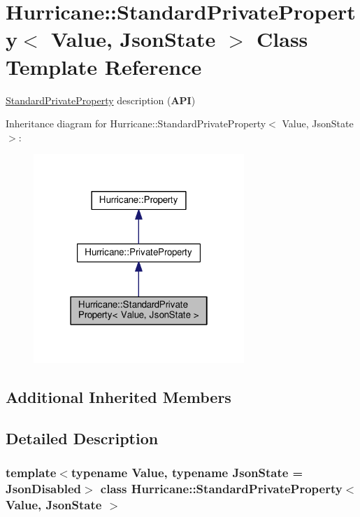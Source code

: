 \hypertarget{classHurricane_1_1StandardPrivateProperty}{}\section{Hurricane\+:\+:Standard\+Private\+Property$<$ Value, Json\+State $>$ Class Template Reference}
\label{classHurricane_1_1StandardPrivateProperty}


\hyperlink{classHurricane_1_1StandardPrivateProperty}{Standard\+Private\+Property} description ({\bfseries A\+PI})  




Inheritance diagram for Hurricane\+:\+:Standard\+Private\+Property$<$ Value, Json\+State $>$\+:\nopagebreak
\begin{figure}[H]
\begin{center}
\leavevmode
\includegraphics[width=226pt]{classHurricane_1_1StandardPrivateProperty__inherit__graph}
\end{center}
\end{figure}
\subsection*{Additional Inherited Members}


\subsection{Detailed Description}
\subsubsection*{template$<$typename Value, typename Json\+State = Json\+Disabled$>$\newline
class Hurricane\+::\+Standard\+Private\+Property$<$ Value, Json\+State $>$}

